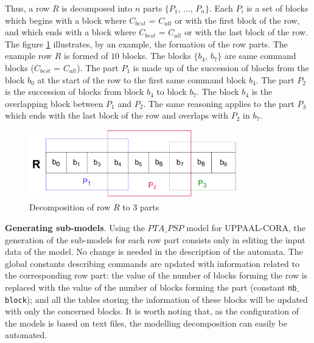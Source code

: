 Thus, a row $R$ is decomposed into $ n $ parts $ \{P_1$, ..., $P_n\}$. Each $P_i$ is a set of blocks which begins with a block where $C_{best}$ = $C_{alt}$ or with the first block of the row, and which ends with a block where $C_{best}$ = $C_{alt}$ or with the last block of the row. The figure \ref{fig:decompositionPulv} illustrates, by an example, the formation of the row parts. The example row $R$ is formed of $10$ blocks. The blocks $\{b_{4}$, $b_{7}\} $ are same command blocks ($C_{best}$ = $C_{alt}$). The part $P_{1}$ is made up of the succession of blocks from the block $b_{0}$ at the start of the row to the first same command block $b_{4}$. The part $ P_ {2} $ is the succession of blocks from block $b_{4}$ to block $b_{7}$. The block $b_{4}$ is the overlapping block between $P_{1}$ and $P_{2}$. The same reasoning applies to the part $P_{3}$ which ends with the last block of the row and overlaps with $ P_ {2} $ in $b_{7}$.

\begin{figure}[h!]
\begin{center}
\includegraphics[width=9cm]{JournalDecPulvMod.pdf} 
\caption{Decomposition of row $R$ to $3$ parts} 
\label{fig:decompositionPulv}
\end{center}
\end{figure} 


\textbf{Generating sub-models}. Using the $PTA\_PSP$ model for UPPAAL-CORA, the generation of the sub-models for each row part consists only in editing the input data of the model. No change is needed in the description of the automata. The global constants describing commands are updated with information related to the corresponding row part: the value of the number of blocks forming the row is replaced with the value of the number of blocks forming the part (constant \texttt{nb$\_$block}); and all the tables storing the information of these blocks will be updated with only the concerned blocks. %
It is worth noting that, as the configuration of the models is based on text files, the modelling decomposition can easily be automated.


